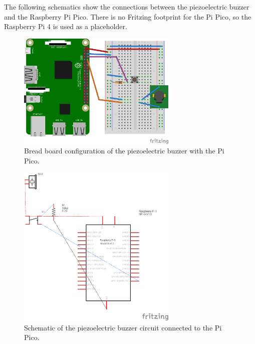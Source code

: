 The following schematics show the connections between the piezoelectric buzzer and the Raspberry Pi Pico. There is no
Fritzing footprint for the Pi Pico, so the Raspberry Pi 4 is used as a placeholder.

\begin{figure}[H]
    \centering
    \includegraphics[width=3in]{../assets/schematics/AudiohatBB.png}
    \caption{Bread board configuration of the piezoelectric buzzer with the Pi Pico.}
\end{figure}

\begin{figure}[H]
    \centering
    \includegraphics[width=3in]{../assets/schematics/AudiohatSchema.png}
    \caption{Schematic of the piezoelectric buzzer circuit connected to the Pi Pico.}
\end{figure}
